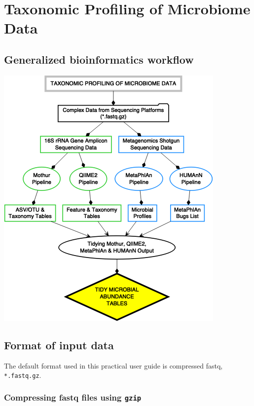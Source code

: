 \documentclass[
  12pt,
  openany]{book}
\begin{document}
\hypertarget{taxonomic-profiling-of-microbiome-data}{%
\chapter{Taxonomic Profiling of Microbiome Data}\label{taxonomic-profiling-of-microbiome-data}}

\hypertarget{generalized-bioinformatics-workflow}{%
\section{Generalized bioinformatics workflow}\label{generalized-bioinformatics-workflow}}

\begin{center}\includegraphics[width=0.8\linewidth,height=0.4\textheight]{./Figures/taxonomic_profiling_output-1} \end{center}

\hypertarget{format-of-input-data}{%
\section{Format of input data}\label{format-of-input-data}}

The default format used in this practical user guide is compressed fastq, \texttt{*.fastq.gz}.

\hypertarget{compressing-fastq-files-using-gzip}{%
\subsection{\texorpdfstring{Compressing fastq files using
\texttt{gzip}}{Compressing fastq files using gzip}}\label{compressing-fastq-files-using-gzip}}
\end{document}
